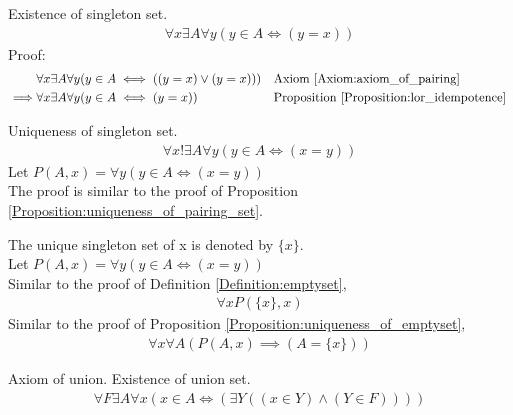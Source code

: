\begin{prop}
\label{Proposition:existence_of_singleton_set}
Existence of singleton set.
\begin{align*}
\forall x \exists A \forall y (y \in A \iff (y=x))
\end{align*}
Proof:
\begin{align*}
& \forall x \exists A \forall y (y \in A \iff ((y=x) \lor (y=x)))
&& \text{Axiom \ref{Axiom:axiom_of_pairing}} \\
\implies & \forall x \exists A \forall y (y \in A \iff (y=x))
&& \text{Proposition \ref{Proposition:lor_idempotence}} \
\end{align*}
\end{prop}

\begin{prop}
\label{Proposition:uniqueness_of_singleton_set}
Uniqueness of singleton set.
\begin{align*}
\forall x !\exists A \forall y (y \in A \iff (x=y))
\end{align*}
Let $P(A,x) =  \forall y (y \in A \iff (x=y))$ \\
The proof is similar to the proof of Proposition \ref{Proposition:uniqueness_of_pairing_set}.
\end{prop}

\begin{defn}
\label{Definition:singleton_set}
The unique singleton set of x is denoted by $\{ x\}$. \\
Let $P(A,x) =  \forall y (y \in A \iff (x=y))$ \\
Similar to the proof of Definition \ref{Definition:emptyset},
\begin{align*}
\forall x P(\{ x \} ,x)
\end{align*}
Similar to the proof of Proposition \ref{Proposition:uniqueness_of_emptyset},
\begin{align*}
\forall x \forall A (P(A,x) \implies (A=\{ x \}))
\end{align*}
\end{defn}

\begin{axm}
\label{Axiom:axiom_of_union}
Axiom of union. Existence of union set.
\begin{align*}
\forall F \exists A \forall x (x \in A \iff (\exists Y ((x \in Y) \land (Y \in F))))
\end{align*}
\end{axm}

